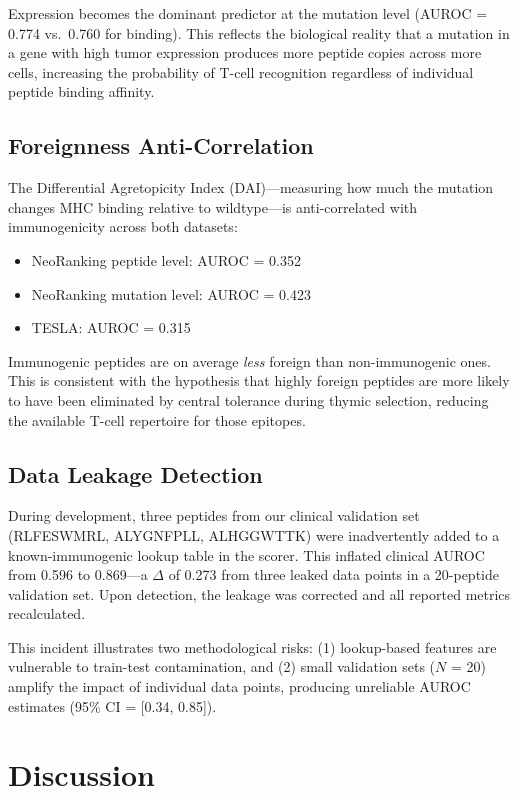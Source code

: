 \documentclass[11pt,twocolumn]{article}
\begin{document}
Expression becomes the dominant predictor at the mutation level (AUROC = 0.774 vs.\ 0.760 for binding). This reflects the biological reality that a mutation in a gene with high tumor expression produces more peptide copies across more cells, increasing the probability of T-cell recognition regardless of individual peptide binding affinity.

\subsection{Foreignness Anti-Correlation}

The Differential Agretopicity Index (DAI)---measuring how much the mutation changes MHC binding relative to wildtype---is anti-correlated with immunogenicity across both datasets:

\begin{itemize}[leftmargin=*,topsep=0pt]
\item NeoRanking peptide level: AUROC = 0.352
\item NeoRanking mutation level: AUROC = 0.423
\item TESLA: AUROC = 0.315
\end{itemize}

Immunogenic peptides are on average \textit{less} foreign than non-immunogenic ones. This is consistent with the hypothesis that highly foreign peptides are more likely to have been eliminated by central tolerance during thymic selection, reducing the available T-cell repertoire for those epitopes.

\subsection{Data Leakage Detection}

During development, three peptides from our clinical validation set (RLFESWMRL, ALYGNFPLL, ALHGGWTTK) were inadvertently added to a known-immunogenic lookup table in the scorer. This inflated clinical AUROC from 0.596 to 0.869---a $\Delta$ of 0.273 from three leaked data points in a 20-peptide validation set. Upon detection, the leakage was corrected and all reported metrics recalculated.

This incident illustrates two methodological risks: (1) lookup-based features are vulnerable to train-test contamination, and (2) small validation sets ($N$ = 20) amplify the impact of individual data points, producing unreliable AUROC estimates (95\% CI = [0.34, 0.85]).

\section{Discussion}
\end{document}
